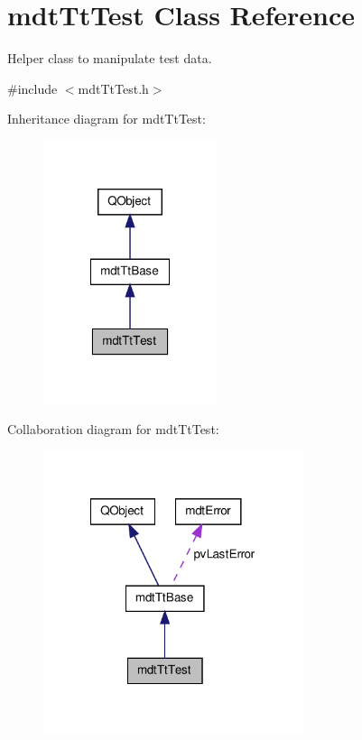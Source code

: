 \hypertarget{classmdt_tt_test}{\section{mdt\-Tt\-Test Class Reference}
\label{classmdt_tt_test}
}


Helper class to manipulate test data.  




{\ttfamily \#include $<$mdt\-Tt\-Test.\-h$>$}



Inheritance diagram for mdt\-Tt\-Test\-:\nopagebreak
\begin{figure}[H]
\begin{center}
\leavevmode
\includegraphics[width=144pt]{classmdt_tt_test__inherit__graph}
\end{center}
\end{figure}


Collaboration diagram for mdt\-Tt\-Test\-:\nopagebreak
\begin{figure}[H]
\begin{center}
\leavevmode
\includegraphics[width=216pt]{classmdt_tt_test__coll__graph}
\end{center}
\end{figure}
